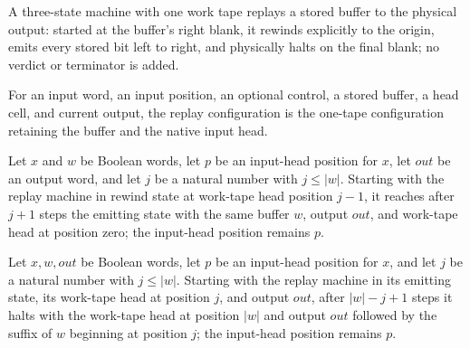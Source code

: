 \begin{definition}
\label{Complexity.clReplayTM}
\leanok
{}
A three-state machine with one work tape replays a stored buffer to the physical output: started at the buffer's right blank, it rewinds explicitly to the origin, emits every stored bit left to right, and physically halts on the final blank; no verdict or terminator is added.
\end{definition}

\begin{definition}
\label{Complexity.clReplayCfg}
\leanok
{}
For an input word, an input position, an optional control, a stored buffer, a head cell, and current output, the replay configuration is the one-tape configuration retaining the buffer and the native input head.
\end{definition}

\begin{lemma}
\label{Complexity.clReplay_back}
\leanok
{}
Let $x$ and $w$ be Boolean words, let $p$ be an input-head position for $x$, let $out$
be an output word, and let $j$ be a natural number with $j\le |w|$. Starting with the
replay machine in rewind state at work-tape head position $j-1$, it reaches after $j+1$
steps the emitting state with the same buffer $w$, output $out$, and work-tape head at
position zero; the input-head position remains $p$.
\end{lemma}

\begin{lemma}
\label{Complexity.clReplay_forward}
\leanok
{}
Let $x,w,out$ be Boolean words, let $p$ be an input-head position for $x$, and let $j$
be a natural number with $j\le |w|$. Starting with the replay machine in its emitting
state, its work-tape head at position $j$, and output $out$, after $|w|-j+1$ steps it
halts with the work-tape head at position $|w|$ and output $out$ followed by the suffix
of $w$ beginning at position $j$; the input-head position remains $p$.
\end{lemma}

